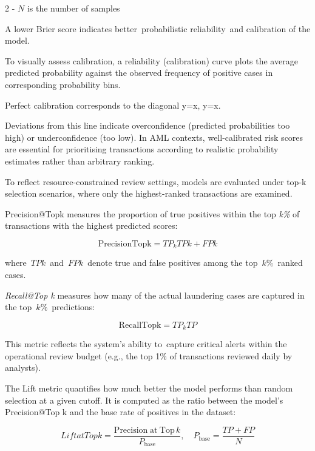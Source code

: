 \begin{multicols}{2}
- \(N\) is the number of samples

A lower Brier score indicates better~probabilistic reliability~and
calibration of the model.

To visually assess calibration, a reliability (calibration)
curve plots the average predicted probability against the
observed frequency of positive cases in corresponding probability bins.

Perfect calibration corresponds to the diagonal y=x, y=x.

Deviations from this line indicate overconfidence (predicted
probabilities too high) or underconfidence (too low). In AML
contexts, well-calibrated risk scores are essential for prioritising
transactions according to realistic probability estimates rather than
arbitrary ranking.

To reflect resource-constrained review settings, models are evaluated
under top-k selection scenarios, where only the highest-ranked
transactions are examined.

Precision@Topk measures the proportion of true positives within the
top \emph{k\%} of transactions with the highest predicted scores:

\begin{equation}
\text{PrecisionTopk} = TP_{k}TPk + FPk
\end{equation}

where~\(TPk\)~and~\(FPk\)~denote true and false
positives among the top~\(k\%\)~ranked cases.

\emph{Recall@Top k} measures how many of the actual laundering cases are
captured in the top~\(k\%\)~predictions:

\begin{equation}
\text{RecallTopk} = TP_{k}TP
\end{equation}

This metric reflects the system's ability to~capture critical
alerts within the operational review budget (e.g., the top 1\% of
transactions reviewed daily by analysts).

The Lift metric quantifies how much better the model performs than
random selection at a given cutoff. It is computed as the ratio between
the model's Precision@Top k and the base rate of positives in the
dataset:
\end{multicols}
\vspace{-1em}
\begin{equation}
LiftatTopk = \frac{\text{Precision at Top}\, k}{P_{\text{base}}},
\quad P_{\text{base}} = \frac{TP + FP}{N}
\end{equation}

